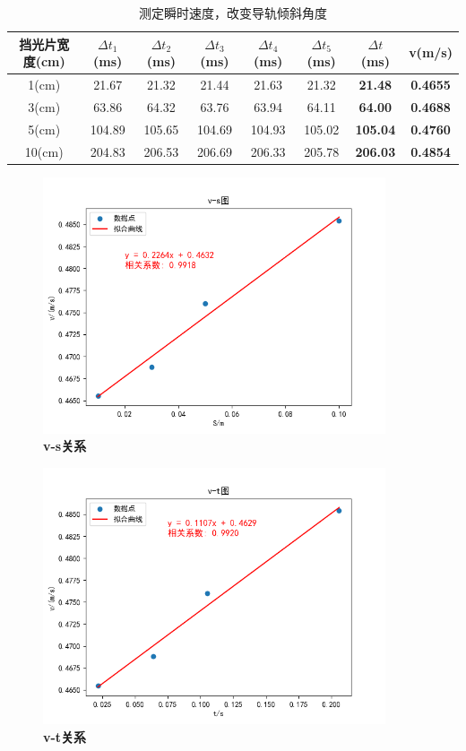 \documentclass[UTF8]{article}
\theoremstyle{MyLineTheoremStyle} %
\theoremstyle{MyBlockTheoremStyle} %
\theoremstyle{MySubsubsectionStyle} %
\begin{document}
\begin{table}[H]
    \centering
    \begin{tabular}{|c|c|c|c|c|c|c|c|}
        \hline
        挡光片宽度(cm) & $\Delta t_1$(ms) & $\Delta t_2$(ms) & $\Delta t_3$(ms) & $\Delta t_4$(ms) & $\Delta t_5$(ms) & $\Delta t$(ms) & v(m/s)\\
        \hline
        1(cm) & 21.67 & 21.32 & 21.44 & 21.63 & 21.32 & \textbf{21.48} & \textbf{0.4655}\\
        \hline
        3(cm) & 63.86 & 64.32 & 63.76 & 63.94 & 64.11 & \textbf{64.00} & \textbf{0.4688}\\
        \hline
        5(cm) & 104.89 & 105.65 & 104.69 & 104.93 & 105.02 & \textbf{105.04} & \textbf{0.4760}\\
        \hline
        10(cm) & 204.83 & 206.53 & 206.69 & 206.33 & 205.78 & \textbf{206.03} & \textbf{0.4854}\\
        \hline		
    \end{tabular}
    \caption{\small 测定瞬时速度，改变导轨倾斜角度}
\end{table}


\begin{figure}[H]
    \centering
    \includegraphics[width=0.9\textwidth]{Figure_7.png}
    \caption{\bfseries v-s关系}
\end{figure}

\begin{figure}[H]
    \centering
    \includegraphics[width=0.9\textwidth]{Figure_8.png}
    \caption{\bfseries v-t关系}
\end{figure}
\end{document}
